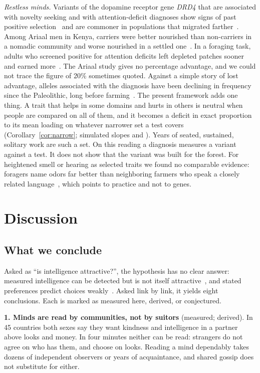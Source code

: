 \emph{Restless minds.} Variants of the dopamine receptor gene \textit{DRD4} that are associated with novelty seeking and
with attention-deficit diagnoses show signs of past positive selection~\cite{ding2002,williams2006} and are commoner in
populations that migrated farther~\cite{matthews2011}. Among Ariaal men in Kenya, carriers were better nourished than
non-carriers in a nomadic community and worse nourished in a settled one~\cite{eisenberg2008}. In a foraging task, adults
who screened positive for attention deficits left depleted patches sooner and earned more~\cite{barack2024}. The Ariaal
study gives no percentage advantage, and we could not trace the figure of 20\% sometimes quoted. Against a simple story of
lost advantage, alleles associated with the diagnosis have been declining in frequency since the Paleolithic, long before
farming~\cite{esteller2020}. The present framework adds one thing. A trait that helps in some domains and hurts in others
is neutral when people are compared on all of them, and it becomes a deficit in exact proportion to its mean loading on
whatever narrower set a test covers (Corollary~\ref{cor:narrow}; simulated slopes \NtNarBroad{} and \NtNarHurt). Years of
seated, sustained, solitary work are such a set. On this reading a diagnosis measures a variant against a test. It does
not show that the variant was built for the forest. For heightened smell or hearing as selected traits we found no
comparable evidence: foragers name odors far better than neighboring farmers who speak a closely related
language~\cite{majid2018}, which points to practice and not to genes.

\section{Discussion}

\subsection{What we conclude}\label{sec:conclude}

Asked as ``is intelligence attractive?'', the hypothesis has no clear answer: measured intelligence can be detected but is
not itself attractive~\cite{driebe2021}, and stated preferences predict choices weakly~\cite{todd2007,eastwick2014,eastwick2025}.
Asked link by link, it yields eight conclusions. Each is marked as measured here, derived, or conjectured.

\textbf{1. Minds are read by communities, not by suitors} (measured; derived). In 45 countries both sexes say they want
kindness and intelligence in a partner above looks and money. In four minutes neither can be read: strangers do not agree
on who has them, and choose on looks. Reading a mind dependably takes dozens of independent observers or years of
acquaintance, and shared gossip does not substitute for either.

